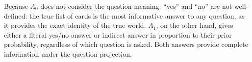 \documentclass[11pt, floatsintext]{apa6}
\begin{document}


Because $A_0$ does not consider the question meaning, ``yes'' and ``no'' are not well-defined: the true list of cards is the most informative answer to any question, as it provides the exact identity of the true world. $A_1$, on the other hand, gives either a literal yes/no answer or indirect answer in proportion to their prior probability, regardless of which question is asked. Both answers provide complete information under the question projection.
\end{document}
